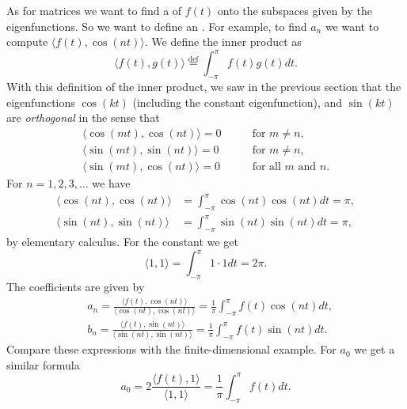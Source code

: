 \documentclass{ximera}
\begin{document}
As for matrices we want to find a \emph{} of $f(t)$ onto the subspaces given by the eigenfunctions.  So we want to define an \emph{}.  For example, to find $a_n$ we want to compute $\langle  f(t)  ,  \cos (nt)  \rangle$. We define the inner product as
\begin{equation*}
    \langle  f(t) ,  g(t)  \rangle \overset{\text{def}}{=} \int_{-\pi}^\pi f(t)  g(t)  dt .
\end{equation*}
With this definition of the inner product, we saw in the previous section that the eigenfunctions $\cos (kt)$ (including the constant eigenfunction), and $\sin (kt)$ are \emph{orthogonal} in the sense that
\begin{align*}
    \langle  \cos (mt) ,  \cos (nt)  \rangle = 0 & \qquad \text{for } m \not= n , \\
    \langle  \sin (mt) ,  \sin (nt)  \rangle = 0 & \qquad \text{for } m \not= n , \\
    \langle  \sin (mt) ,  \cos (nt)  \rangle = 0 & \qquad \text{for all } m \text{ and } n .
\end{align*}
For $n=1,2,3,\ldots$
we have
\begin{align*}
    \langle  \cos (nt)  ,  \cos (nt)  \rangle 
    &= \int_{-\pi}^\pi \cos(nt)\cos(nt)  dt = \pi, \\
    \langle  \sin (nt)  ,  \sin (nt)  \rangle 
    &= \int_{-\pi}^\pi \sin(nt)\sin(nt)  dt = \pi,
\end{align*}
by elementary calculus.  For the constant we get
\begin{equation*}
    \langle  1  ,  1  \rangle = \int_{-\pi}^\pi 1 \cdot 1  dt  = 2\pi.
\end{equation*}
The coefficients are given by
\begin{equation*}
    \begin{aligned}
        & a_n = \frac{\langle  f(t)  ,  \cos (nt)  \rangle}{\langle  \cos (nt), \cos (nt)  \rangle}
        = \frac{1}{\pi} \int_{-\pi}^\pi f(t) \cos (nt)  dt , \\
        & b_n = \frac{\langle  f(t)  ,  \sin (nt)  \rangle}{\langle  \sin (nt), \sin (nt)  \rangle}
        = \frac{1}{\pi} \int_{-\pi}^\pi f(t) \sin (nt)  dt .
    \end{aligned}
\end{equation*}
Compare these expressions with the finite-dimensional example. For $a_0$ we get a similar formula
\begin{equation*}
    a_0 = 2 \frac{\langle  f(t)  ,  1  \rangle}{\langle  1  ,  1  \rangle} = \frac{1}{\pi} \int_{-\pi}^\pi f(t)  dt .
\end{equation*}
\end{document}
